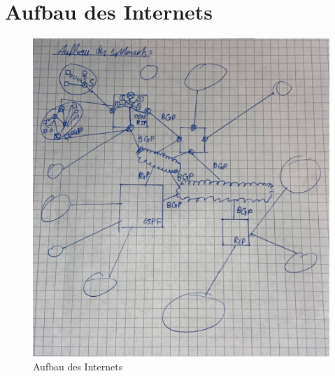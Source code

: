 \chapter{Aufbau des Internets}
\begin{figure}[H]
	\centering
	\includegraphics[width=0.8\linewidth]{figures/aufbau_internet.jpeg}
	\caption{Aufbau des Internets}
\end{figure}